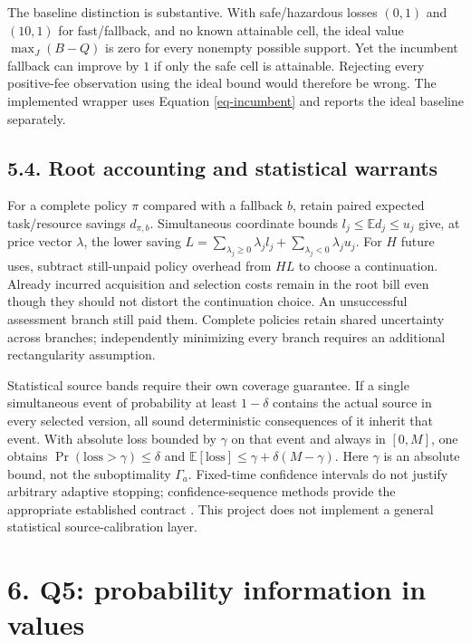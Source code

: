 \documentclass{article}
\theoremstyle{definition}
\begin{document}
The baseline distinction is substantive. With safe/hazardous losses
\((0,1)\) and \((10,1)\) for fast/fallback, and no known attainable
cell, the ideal value \(\max_J(B-Q)\) is zero for every nonempty
possible support. Yet the incumbent fallback can improve by \(1\) if
only the safe cell is attainable. Rejecting every positive-fee
observation using the ideal bound would therefore be wrong. The
implemented wrapper uses Equation \ref{eq-incumbent} and reports the
ideal baseline separately.

\subsection{5.4. Root accounting and statistical
warrants}\label{sec-accounting}

For a complete policy \(\pi\) compared with a fallback \(b\), retain
paired expected task/resource savings \(d_{\pi,b}\). Simultaneous
coordinate bounds \(l_j\leq\mathbb E d_j\leq u_j\) give, at price vector
\(\lambda\), the lower saving
\(L=\sum_{\lambda_j\geq0}\lambda_jl_j+\sum_{\lambda_j<0}\lambda_ju_j\).
For \(H\) future uses, subtract still-unpaid policy overhead from \(HL\)
to choose a continuation. Already incurred acquisition and selection
costs remain in the root bill even though they should not distort the
continuation choice. An unsuccessful assessment branch still paid them.
Complete policies retain shared uncertainty across branches;
independently minimizing every branch requires an additional
rectangularity assumption.

Statistical source bands require their own coverage guarantee. If a
single simultaneous event of probability at least \(1-\delta\) contains
the actual source in every selected version, all sound deterministic
consequences of it inherit that event. With absolute loss bounded by
\(\gamma\) on that event and always in \([0,M]\), one obtains
\(\Pr(\text{loss}>\gamma)\leq\delta\) and
\(\mathbb E[\text{loss}]\leq\gamma+\delta(M-\gamma)\). Here \(\gamma\)
is an absolute bound, not the suboptimality \(\Gamma_a\). Fixed-time
confidence intervals do not justify arbitrary adaptive stopping;
confidence-sequence methods provide the appropriate established contract
\citep{howard}. This project does not implement a general statistical
source-calibration layer.

\section{6. Q5: probability information in values}\label{sec-q5}
\end{document}
